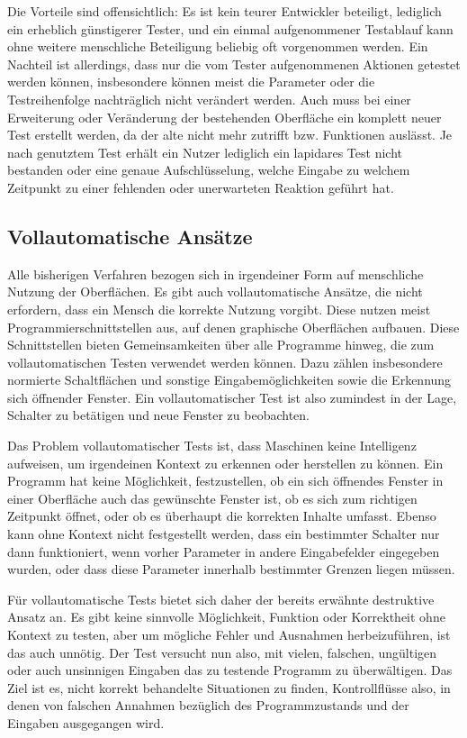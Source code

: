 Die Vorteile sind offensichtlich: Es ist kein teurer Entwickler beteiligt, lediglich ein
erheblich günstigerer Tester, und ein einmal aufgenommener Testablauf kann ohne weitere
menschliche Beteiligung beliebig oft vorgenommen werden. Ein Nachteil ist allerdings, dass
nur die vom Tester aufgenommenen Aktionen getestet werden können, insbesondere können
meist die Parameter oder die Testreihenfolge nachträglich nicht verändert werden. Auch
muss bei einer Erweiterung oder Veränderung der bestehenden Oberfläche ein komplett neuer Test
erstellt werden, da der alte nicht mehr zutrifft bzw. Funktionen auslässt. Je nach genutztem
Test erhält ein Nutzer lediglich ein lapidares \glqq{}Test nicht bestanden\grqq{} oder
eine genaue Aufschlüsselung, welche Eingabe zu welchem Zeitpunkt zu einer fehlenden 
oder unerwarteten Reaktion geführt hat.

\subsection{Vollautomatische Ansätze}

Alle bisherigen Verfahren bezogen sich in irgendeiner Form auf menschliche Nutzung der
Oberflächen. Es gibt auch vollautomatische Ansätze, die nicht erfordern, dass ein Mensch
die korrekte Nutzung vorgibt. Diese nutzen meist Programmierschnittstellen aus,
auf denen graphische Oberflächen aufbauen. Diese Schnittstellen bieten Gemeinsamkeiten
über alle Programme hinweg, die zum vollautomatischen Testen verwendet werden können.
Dazu zählen insbesondere normierte Schaltflächen und sonstige Eingabemöglichkeiten
sowie die Erkennung sich öffnender Fenster. Ein vollautomatischer Test ist also zumindest
in der Lage, Schalter zu betätigen und neue Fenster zu beobachten.

Das Problem vollautomatischer Tests ist, dass Maschinen keine Intelligenz aufweisen,
um irgendeinen Kontext zu erkennen oder herstellen zu können. Ein Programm hat
keine Möglichkeit, festzustellen, ob ein sich öffnendes Fenster in einer Oberfläche
auch das gewünschte Fenster ist, ob es sich zum richtigen Zeitpunkt öffnet, oder
ob es überhaupt die korrekten Inhalte umfasst. Ebenso kann ohne Kontext nicht festgestellt
werden, dass ein bestimmter Schalter nur dann funktioniert, wenn vorher Parameter
in andere Eingabefelder eingegeben wurden, oder dass diese Parameter innerhalb bestimmter
Grenzen liegen müssen.

Für vollautomatische Tests bietet sich daher der bereits erwähnte destruktive Ansatz an.
Es gibt keine sinnvolle Möglichkeit, Funktion oder Korrektheit ohne Kontext zu testen,
aber um mögliche Fehler und Ausnahmen herbeizuführen, ist das auch unnötig.
Der Test versucht nun also, mit vielen, falschen, ungültigen oder auch unsinnigen
Eingaben das zu testende Programm zu überwältigen. Das Ziel ist es, nicht korrekt
behandelte Situationen zu finden, Kontrollflüsse also, in denen von falschen
Annahmen bezüglich des Programmzustands und der Eingaben ausgegangen wird.

